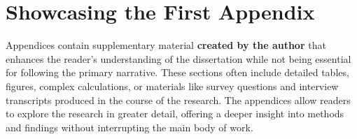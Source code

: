 \chapter{Showcasing the First Appendix}

Appendices contain supplementary material \textbf{created by the author} that enhances the reader’s understanding of the dissertation while not being essential for following the primary narrative. These sections often include detailed tables, figures, complex calculations, or materials like survey questions and interview transcripts produced in the course of the research. The appendices allow readers to explore the research in greater detail, offering a deeper insight into methods and findings without interrupting the main body of work.